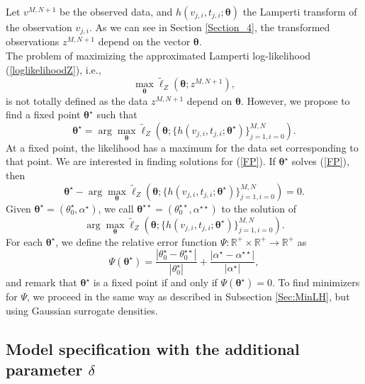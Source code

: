 \documentclass[11pt]{article}
\theoremstyle{definition}
\newcommand{\R}{\mathbb{R}}
\begin{document}
Let $v^{M,N+1}$ be the observed data, and $h( v_{j,i},t_{j,i};\bm{\theta})$ the Lamperti transform of the observation $v_{j,i}$. As we can see in Section \ref{Section_4}, the transformed observations $z^{M,N+1}$ depend on the vector $\bm{\theta}$.\\
The problem of maximizing the approximated Lamperti log-likelihood (\ref{loglikelihoodZ}), i.e.,  $$\max_{\bm{\theta}}\tilde{\ell}_Z\left(\bm{\theta}; z^{M,N+1}\right),$$
is not totally defined as the data $z^{M,N+1}$ depend on $\bm{\theta}$. However, we propose to find a fixed point $\bm{\theta}^\star $ such that
\begin{equation}
\bm{\theta}^\star=\arg\max_{\bm{\theta}}\tilde{\ell}_Z\left(\bm{\theta};\{h( v_{j,i},t_{j,i};\bm{\theta}^\star )\}_{j=1,i=0}^{M,N}\right).
\label{FP}
\end{equation}
At a fixed point, the likelihood has a maximum for the data set corresponding to that point. We are interested in finding solutions for (\ref{FP}). If $\bm{\theta}^\star $ solves (\ref{FP}), then
\begin{equation*}
\bm{\theta}^\star -\arg\max_{\bm{\theta}}\tilde{\ell}_Z\left(\bm{\theta};\{h( v_{j,i},t_{j,i};\bm{\theta}^\star )\}_{j=1,i=0}^{M,N}\right)=0.
\end{equation*}
Given $\bm{\theta}^\star =(\theta_0^\star ,\alpha^\star )$, we call $\bm{\theta}^{\star \star }=(\theta_0^{\star \star },\alpha^{\star \star })$ to the solution of
\begin{equation*}
\arg\max_{\bm{\theta}}\tilde{\ell}_Z\left(\bm{\theta};\{h( v_{j,i},t_{j,i};\bm{\theta}^\star )\}_{j=1,i=0}^{M,N}\right).
\end{equation*}
For each $\bm{\theta}^\star $, we define the relative error function $\Psi:\R^+\times\R^+\to\R^+$ as
\begin{equation}
\Psi(\bm{\theta}^\star )=\frac{|\theta_0^\star -\theta_0^{\star \star }|}{|\theta_0^\star |}+\frac{|\alpha^\star -\alpha^{\star \star }|}{|\alpha^\star |},
\label{eq:rel_error}
\end{equation}
and remark that $\bm{\theta}^\star $ is a fixed point if and only if $\Psi(\bm{\theta}^\star )=0$. To find minimizers for $\Psi$, we proceed in the same way as described in Subsection \ref{Sec:MinLH}, but using Gaussian surrogate densities.

\subsection{Model specification with the additional parameter $\delta$}
\end{document}
